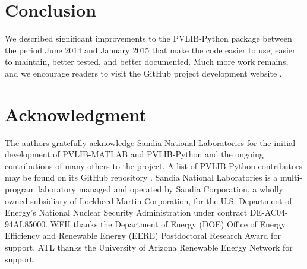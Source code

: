 \documentclass[conference]{IEEEtran}
\begin{document}
\section{Conclusion}
We described significant improvements to the PVLIB-Python package between the period June 2014 and January 2015 that make the code easier to use, easier to maintain, better tested, and better documented. 
Much more work remains, and we encourage readers to visit the GitHub project development website \cite{pvlib-github}.


\section*{Acknowledgment}
The authors gratefully acknowledge Sandia National Laboratories for the initial development of PVLIB-MATLAB and PVLIB-Python and the ongoing contributions of many others to the project.
A list of PVLIB-Python contributors may be found on its GitHub repository \cite{pvlib-github}.
Sandia National Laboratories is a multi-program laboratory managed and operated by Sandia Corporation, a wholly owned subsidiary of Lockheed Martin Corporation, for the U.S. Department of Energy's National Nuclear Security Administration under contract DE-AC04-94AL85000.
WFH thanks the Department of Energy (DOE) Office of Energy Efficiency and Renewable Energy (EERE) Postdoctoral Research Award for support. 
ATL thanks the University of Arizona Renewable Energy Network for support.

\vfil\eject







\end{document}
